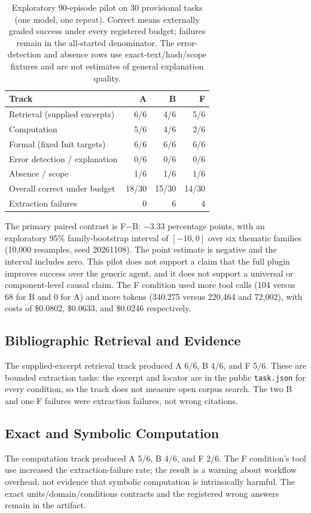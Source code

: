 \documentclass{article}
\begin{document}
\begin{table}[t]
\centering
\small
\begin{tabular}{lrrr}
\toprule
Track & A & B & F \\
\midrule
Retrieval (supplied excerpts) & 6/6 & 4/6 & 5/6 \\
Computation & 5/6 & 4/6 & 2/6 \\
Formal (fixed Init targets) & 6/6 & 6/6 & 6/6 \\
Error detection / explanation & 0/6 & 0/6 & 0/6 \\
Absence / scope & 1/6 & 1/6 & 1/6 \\
\midrule
Overall correct under budget & 18/30 & 15/30 & 14/30 \\
Extraction failures & 0 & 6 & 4 \\
\bottomrule
\end{tabular}
\caption{Exploratory 90-episode pilot on 30 provisional tasks (one model,
one repeat). Correct means externally graded success under every registered
budget; failures remain in the all-started denominator. The error-detection
and absence rows use exact-text/hash/scope fixtures and are not estimates of
general explanation quality.}
\label{tab:pilot}
\end{table}

The primary paired contrast is F$-$B: $-3.33$ percentage points, with an
exploratory 95\% family-bootstrap interval of $[-10,0]$ over six thematic
families (10{,}000 resamples, seed 20261108). The point estimate is negative
and the interval includes zero. This pilot does not support a claim that the
full plugin improves success over the generic agent, and it does not support a
universal or component-level causal claim. The F condition used more tool calls
(104 versus 68 for B and 0 for A) and more tokens (340{,}275 versus 220{,}464
and 72{,}002), with costs of \$0.0802, \$0.0633, and \$0.0246 respectively.

\subsection{Bibliographic Retrieval and Evidence}
The supplied-excerpt retrieval track produced A 6/6, B 4/6, and F 5/6. These
are bounded extraction tasks: the excerpt and locator are in the public
\texttt{task.json} for every condition, so the track does not measure open
corpus search. The two B and one F failures were extraction failures, not
wrong citations.

\subsection{Exact and Symbolic Computation}
The computation track produced A 5/6, B 4/6, and F 2/6. The F condition's tool
use increased the extraction-failure rate; the result is a warning about
workflow overhead, not evidence that symbolic computation is intrinsically
harmful. The exact units/domain/conditions contracts and the registered wrong
answers remain in the artifact.
\end{document}
